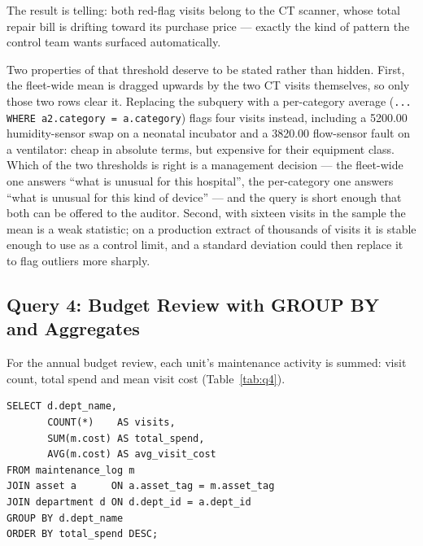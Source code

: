 \documentclass[conference]{IEEEtran}
\begin{document}
The result is telling: both red-flag visits belong to the CT scanner, whose
total repair bill is drifting toward its purchase price --- exactly the kind
of pattern the control team wants surfaced automatically.

Two properties of that threshold deserve to be stated rather than hidden.
First, the fleet-wide mean is dragged upwards by the two CT visits themselves,
so only those two rows clear it. Replacing the subquery with a per-category
average (\texttt{... WHERE a2.category = a.category}) flags four visits
instead, including a 5200.00 humidity-sensor swap on a neonatal incubator and a
3820.00 flow-sensor fault on a ventilator: cheap in absolute terms, but
expensive for their equipment class. Which of the two thresholds is right is a
management decision --- the fleet-wide one answers ``what is unusual for this
hospital'', the per-category one answers ``what is unusual for this kind of
device'' --- and the query is short enough that both can be offered to the
auditor. Second, with sixteen visits in the sample the mean is a weak
statistic; on a production extract of thousands of visits it is stable enough
to use as a control limit, and a standard deviation could then replace it to
flag outliers more sharply.

\subsection{Query 4: Budget Review with GROUP BY and Aggregates}
For the annual budget review, each unit's maintenance activity is summed:
visit count, total spend and mean visit cost (Table~\ref{tab:q4}).

\begin{lstlisting}[style=sqlstyle]
SELECT d.dept_name,
       COUNT(*)    AS visits,
       SUM(m.cost) AS total_spend,
       AVG(m.cost) AS avg_visit_cost
FROM maintenance_log m
JOIN asset a      ON a.asset_tag = m.asset_tag
JOIN department d ON d.dept_id = a.dept_id
GROUP BY d.dept_name
ORDER BY total_spend DESC;
\end{lstlisting}
\end{document}
